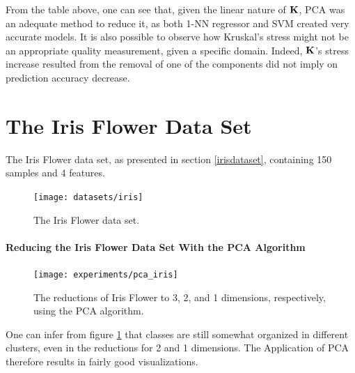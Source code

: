 From the table above, one can see that, given the linear nature of $\mathbf{K}$, PCA was an adequate method to reduce it, as both 1-NN regressor and SVM created very accurate models. It is also possible to observe how Kruskal's stress might not be an appropriate quality measurement, given a specific domain. Indeed, $\mathbf{K}$'s stress increase resulted from the removal of one of the components did not imply on prediction accuracy decrease.

\clearpage
\section{The Iris Flower Data Set}

The Iris Flower data set, as presented in section \ref{irisdataset}, containing 150 samples and 4 features.

\begin{figure}[H]
	\centering
	\captionsetup{justification=centering}
	\texttt{[image: datasets/iris]}
	\caption{The Iris Flower data set.}
\end{figure}

\newpage
\paragraph{Reducing the Iris Flower Data Set With the PCA Algorithm}

\begin{figure}[H]
	\centering
	\captionsetup{justification=centering}
	\texttt{[image: experiments/pca\_iris]}
	\caption{The reductions of Iris Flower to 3, 2, and 1 dimensions, respectively, using the PCA algorithm.}
	\label{fig:dsirispca}
\end{figure}

One can infer from figure \ref{fig:dsirispca} that classes are still somewhat organized in different clusters, even in the reductions for 2 and 1 dimensions. The Application of PCA therefore results in fairly good visualizations.

